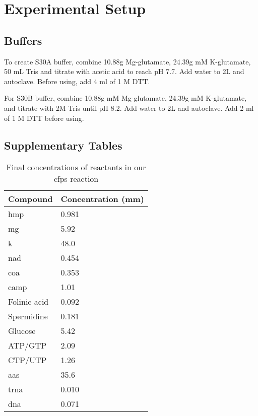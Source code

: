 \appendix
\chapter{Experimental Setup}
\label{app:exp}

\section{Buffers}
To create S30A buffer, combine 10.88g Mg-glutamate, 24.39g mM K-glutamate, 50 mL Tris and titrate with acetic acid to reach pH 7.7.
Add water to 2L and autoclave.
Before using, add 4 ml of 1 M DTT.

For S30B buffer, combine 10.88g mM Mg-glutamate, 24.39g mM K-glutamate, and titrate with 2M Tris until pH 8.2.
Add water to 2L and autoclave.
Add 2 ml of 1 M DTT before using.

\section{Supplementary Tables}

\begin{table}[h!]
\centering
\begin{tabular}{ll}
Compound     & Concentration (\gls{mm}) \\ \hline
\gls{hmp}           & 0.981              \\
\gls{mg}           & 5.92               \\
\gls{k}           & 48.0               \\
\gls{nad}          & 0.454              \\
\gls{coa}          & 0.353              \\
\gls{camp}         & 1.01               \\
Folinic acid & 0.092              \\
Spermidine   & 0.181              \\
Glucose      & 5.42               \\
ATP/GTP      & 2.09               \\
CTP/UTP      & 1.26               \\
\glspl{aa}  & 35.6               \\
\gls{trna}        & 0.010              \\
\gls{dna}          & 0.071             
\end{tabular}
\caption{Final concentrations of reactants in our \gls{cfps} reaction}
\label{tab:cf-conc}
\end{table}

